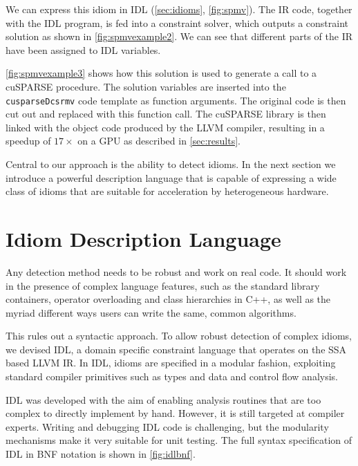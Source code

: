     We can express this idiom in IDL (\autoref{sec:idioms}, \autoref{fig:spmv}).
    The IR code, together with the IDL program, is fed into a constraint solver,
    which outputs a constraint solution as shown in \autoref{fig:spmvexample2}.
    We can see that different parts of the IR have been assigned to IDL
    variables.

    \autoref{fig:spmvexample3} shows how this solution is used to generate a
    call to a cuSPARSE procedure.
    The solution variables are inserted into the {\tt cusparseDcsrmv} code
    template as function arguments. 
    The original code is then cut out and replaced with this function call.
    The cuSPARSE library is then linked with the object code produced by the
    LLVM compiler, resulting in a speedup of $17\times$ on a GPU as described in
    \autoref{sec:results}.

    Central to our approach is the ability to detect idioms.
    In the next section we introduce a powerful description language that is
    capable of expressing a wide class of idioms that are suitable for
    acceleration by heterogeneous hardware.

\section{Idiom Description Language}

\begin{figure}[t]
    
    \label{fig:idlbnf}
\end{figure}

    Any detection method needs to be robust and work on real code.
    It should work in the presence of complex language features, such as the
    standard library containers, operator overloading and class hierarchies in
    C++, as well as the myriad different ways users can write the same, common
    algorithms.

    This rules out a syntactic approach.
    To allow robust detection of complex idioms, we devised IDL, a domain
    specific constraint language that operates on the SSA based LLVM IR.
    In IDL, idioms are specified in a modular fashion, exploiting standard
    compiler primitives such as types and data and control flow analysis.

    IDL was developed with the aim of enabling analysis routines that are too
    complex to directly implement by hand.
    However, it is still targeted at compiler experts.
    Writing and debugging IDL code is challenging, but the modularity mechanisms
    make it very suitable for unit testing.
    The full syntax specification of IDL in BNF notation is shown in
    \autoref{fig:idlbnf}.

